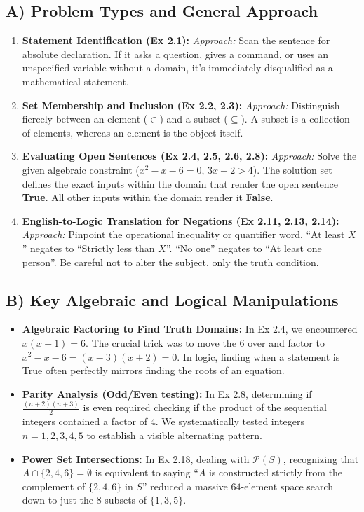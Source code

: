 \documentclass[11pt]{article}
\begin{document}
\subsection{A) Problem Types and General Approach}
\begin{enumerate}
    \item \textbf{Statement Identification (Ex 2.1):} 
    \textit{Approach:} Scan the sentence for absolute declaration. If it asks a question, gives a command, or uses an unspecified variable without a domain, it's immediately disqualified as a mathematical statement. 
    \item \textbf{Set Membership and Inclusion (Ex 2.2, 2.3):}
    \textit{Approach:} Distinguish fiercely between an element ($\in$) and a subset ($\subseteq$). A subset is a collection of elements, whereas an element is the object itself. 
    \item \textbf{Evaluating Open Sentences (Ex 2.4, 2.5, 2.6, 2.8):}
    \textit{Approach:} Solve the given algebraic constraint ($x^2 - x - 6 = 0$, $3x - 2 > 4$). The solution set defines the exact inputs within the domain that render the open sentence \textbf{True}. All other inputs within the domain render it \textbf{False}.
    \item \textbf{English-to-Logic Translation for Negations (Ex 2.11, 2.13, 2.14):}
    \textit{Approach:} Pinpoint the operational inequality or quantifier word. ``At least $X$'' negates to ``Strictly less than $X$''. ``No one'' negates to ``At least one person''. Be careful not to alter the subject, only the truth condition.
\end{enumerate}

\subsection{B) Key Algebraic and Logical Manipulations}
\begin{itemize}
    \item \textbf{Algebraic Factoring to Find Truth Domains:} In Ex 2.4, we encountered $x(x - 1) = 6$. The crucial trick was to move the $6$ over and factor to $x^2 - x - 6 = (x-3)(x+2) = 0$. In logic, finding when a statement is True often perfectly mirrors finding the roots of an equation.
    \item \textbf{Parity Analysis (Odd/Even testing):} In Ex 2.8, determining if $\frac{(n+2)(n+3)}{2}$ is even required checking if the product of the sequential integers contained a factor of $4$. We systematically tested integers $n=1,2,3,4,5$ to establish a visible alternating pattern. 
    \item \textbf{Power Set Intersections:} In Ex 2.18, dealing with $\mathcal{P}(S)$, recognizing that $A \cap \{2,4,6\} = \emptyset$ is equivalent to saying ``$A$ is constructed strictly from the complement of $\{2,4,6\}$ in $S$'' reduced a massive $64$-element space search down to just the $8$ subsets of $\{1,3,5\}$.
\end{itemize}
\end{document}

